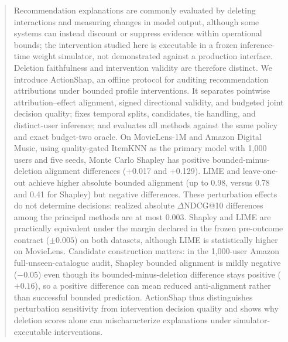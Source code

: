\documentclass[manuscript,screen,review,anonymous]{acmart}
\begin{document}
\begin{abstract}
Recommendation explanations are commonly evaluated by deleting interactions and measuring changes in model output, although some systems can instead discount or suppress evidence within operational bounds; the intervention studied here is executable in a frozen inference-time weight simulator, not demonstrated against a production interface. Deletion faithfulness and intervention validity are therefore distinct. We introduce ActionShap, an offline protocol for auditing recommendation attributions under bounded profile interventions. It separates pointwise attribution--effect alignment, signed directional validity, and budgeted joint decision quality; fixes temporal splits, candidates, tie handling, and distinct-user inference; and evaluates all methods against the same policy and exact budget-two oracle. On MovieLens-1M and Amazon Digital Music, using quality-gated ItemKNN as the primary model with 1,000 users and five seeds, Monte Carlo Shapley has positive bounded-minus-deletion alignment differences (+0.017 and +0.129). LIME and leave-one-out achieve higher absolute bounded alignment (up to 0.98, versus 0.78 and 0.41 for Shapley) but negative differences. These perturbation effects do not determine decisions: realized absolute $\Delta$NDCG@10 differences among the principal methods are at most 0.003. Shapley and LIME are practically equivalent under the margin declared in the frozen pre-outcome contract ($\pm0.005$) on both datasets, although LIME is statistically higher on MovieLens. Candidate construction matters: in the 1,000-user Amazon full-unseen-catalogue audit, Shapley bounded alignment is mildly negative ($-0.05$) even though its bounded-minus-deletion difference stays positive ($+0.16$), so a positive difference can mean reduced anti-alignment rather than successful bounded prediction. ActionShap thus distinguishes perturbation sensitivity from intervention decision quality and shows why deletion scores alone can mischaracterize explanations under simulator-executable interventions.
\end{abstract}


\end{document}
